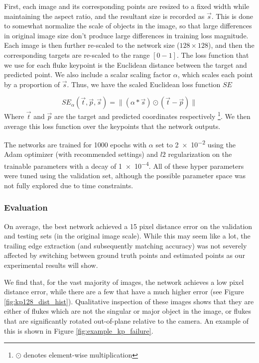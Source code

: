 First, each image and its corresponding points are resized to a fixed width while maintaining the aspect ratio, and the resultant size is recorded as $\vec{s}$.
This is done to somewhat normalize the scale of objects in the image, so that large differences in original image size don't produce large differences in training loss magnitude.
Each image is then further re-scaled to the network size ($128 \times 128$), and then the corresponding targets are re-scaled to the range $[0-1]$.
The loss function that we use for each fluke keypoint is the Euclidean distance between the target and predicted point.
We also include a scalar scaling factor $\alpha$, which scales each point by a proportion of $\vec{s}$.
Thus, we have the scaled Euclidean loss function $SE$

\begin{equation} \label{eqn:se_loss}
SE_{\alpha}(\vec{t}, \vec{p}, \vec{s}) = \lVert (\alpha * \vec{s}) \odot (\vec{t} - \vec{p}) \rVert
\end{equation} 
Where $\vec{t}$ and $\vec{p}$ are the target and predicted coordinates respectively \footnote{$\odot$ denotes element-wise multiplication}.
We then average this loss function over the keypoints that the network outputs.

The networks are trained for 1000 epochs with $\alpha$ set to \num{2e-2} using the Adam \cite{kingma2014adam} optimizer (with recommended settings) and $l2$ regularization on the trainable parameters with a decay of \num{1e-4}.
All of these hyper parameters were tuned using the validation set, although the possible parameter space was not fully explored due to time constraints.

\subsubsection{Evaluation} 

On average, the best network achieved a 15 pixel distance error on the validation and testing sets (in the original image scale).
While this may seem like a lot, the trailing edge extraction (and subsequently matching accuracy) was not severely affected by switching between ground truth points and estimated points as our experimental results will show. 

We find that, for the vast majority of images, the network achieves a low pixel distance error, while there are a few that have a much higher error (see Figure \ref{fig:kp128_dist_hist}).
Qualitative inspection of these images shows that they are either of flukes which are not the singular or major object in the image, or flukes that are significantly rotated out-of-plane relative to the camera.
An example of this is shown in Figure \ref{fig:example_kp_failure}.

